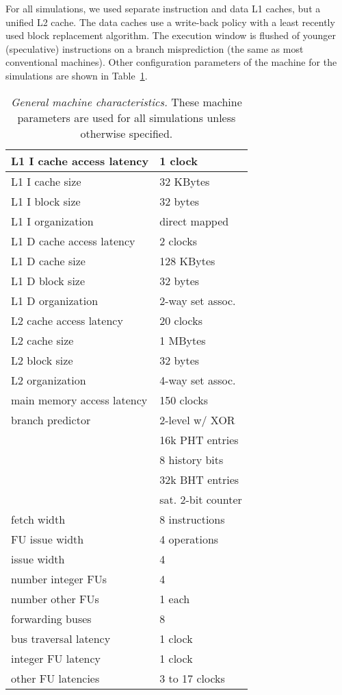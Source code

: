 \documentclass[10pt,twocolumn,dvips]{article}
\begin{document}
For all simulations, we used separate instruction and
data L1 caches, but a unified L2 cache.
The data caches use a write-back policy with a least recently used
block replacement algorithm.
The execution window is flushed of younger (speculative) instructions
on a branch misprediction (the same as most conventional machines).
Other configuration parameters of the machine for the
simulations are shown in Table~\ref{tab:baseline}.

%
\begin{table}
\begin{center}
\caption{{\em General machine characteristics.}
\small{
These machine parameters are used for all simulations
unless otherwise specified.
}
}
\label{tab:baseline}
\scriptsize{
\begin{tabular}{|l|l|}
\hline 
L1 I cache access latency&1 clock\\
\hline
L1 I cache size&32 KBytes\\
\hline
L1 I block size&32 bytes\\
\hline
L1 I organization&direct mapped\\
%
\hline 
L1 D cache access latency&2 clocks\\
\hline
L1 D cache size&128 KBytes\\
\hline
L1 D block size&32 bytes\\
\hline
L1 D organization&2-way set assoc.\\
%
\hline
L2 cache access latency&20 clocks\\
\hline
L2 cache size&1 MBytes\\
\hline
L2 block size&32 bytes\\
\hline
L2 organization&4-way set assoc.\\
%
\hline
main memory access latency&150 clocks\\
\hline
branch predictor&2-level w/ XOR\\
\cline{2-2}
 & 16k PHT entries\\
\cline{2-2}
 & 8 history bits\\
\cline{2-2}
 & 32k BHT entries\\
\cline{2-2}
 & sat. 2-bit counter\\
\hline
fetch width & 8 instructions \\
\hline
FU issue width & 4 operations \\
\hline
issue width & 4 \\
\hline
number integer FUs & 4 \\
\hline
number other FUs & 1 each \\
\hline
forwarding buses & 8 \\
\hline
bus traversal latency & 1 clock \\
\hline
integer FU latency & 1 clock \\
\hline
other FU latencies & 3 to 17 clocks \\
\hline 
\end{tabular}
}
\end{center}
\end{table}
%
\end{document}
